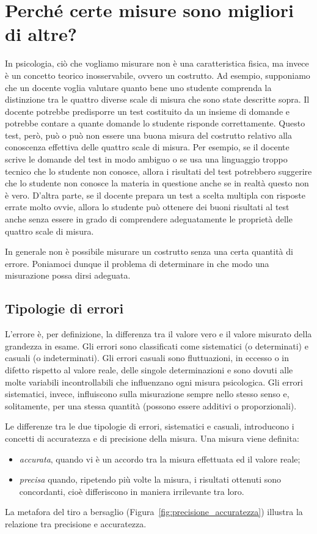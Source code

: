 \section{Perché certe misure sono migliori di altre?}

In psicologia, ciò che vogliamo misurare non è una caratteristica fisica, ma invece è un concetto teorico inosservabile, ovvero un costrutto. 
Ad esempio, supponiamo che un docente voglia valutare quanto bene uno studente comprenda la distinzione tra le quattro diverse scale di misura che sono state descritte sopra. 
Il docente potrebbe predisporre un test costituito da un insieme di domande e potrebbe contare a quante domande lo studente risponde correttamente. 
Questo test, però, può o può non essere una buona misura del costrutto relativo alla conoscenza effettiva delle quattro scale di misura. 
Per esempio, se il docente scrive le domande del test in modo ambiguo o se usa una linguaggio troppo tecnico che lo studente non conosce, allora i risultati del test potrebbero suggerire che lo studente non conosce la materia in questione anche se in realtà questo non è vero. 
D'altra parte, se il docente prepara un test a scelta multipla con risposte errate molto ovvie, allora lo studente può ottenere dei buoni risultati al test anche senza essere in grado di comprendere adeguatamente le proprietà delle quattro scale di misura.

In generale non è possibile misurare un costrutto senza una certa quantità di errore.
Poniamoci dunque il problema di determinare in che modo una misurazione possa dirsi adeguata. 


\subsection{Tipologie di errori}
\label{sec:accuratezza_precisione}

L'errore  è,  per  definizione,  la  differenza  tra  il  valore  vero  e  il  valore misurato della grandezza in esame.  
Gli errori sono classificati  come  sistematici  (o  determinati) e  casuali  (o indeterminati). 
Gli errori casuali sono fluttuazioni, in eccesso o in difetto rispetto al  valore  reale,  delle  singole  determinazioni  e  sono  dovuti  alle molte variabili  incontrollabili che  influenzano  ogni  misura  psicologica.  
Gli errori sistematici, invece, influiscono sulla misurazione sempre nello stesso senso e, solitamente, per una stessa quantità (possono essere additivi o proporzionali). 

Le differenze tra le due tipologie di errori, sistematici e casuali, introducono i concetti di accuratezza e di precisione della misura. 
Una misura viene definita:
\begin{itemize}
\item \emph{accurata}, quando vi è un accordo tra la misura effettuata ed il valore reale;
\item \emph{precisa} quando, ripetendo più volte la misura, i risultati ottenuti sono  concordanti, cioè differiscono in maniera irrilevante tra loro.
\end{itemize}
La metafora del tiro a bersaglio (Figura~\ref{fig:precisione_accuratezza}) illustra la relazione tra precisione e accuratezza.

